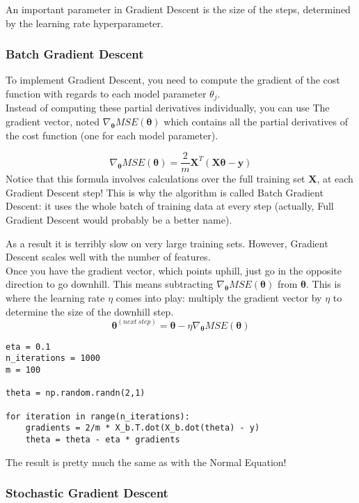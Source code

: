 \documentclass[french]{article}
\begin{document}
An important parameter in Gradient Descent is the size of the steps, determined by the learning rate hyperparameter.

\subsubsection{Batch Gradient Descent}

To implement Gradient Descent, you need to compute the gradient of the cost function with regards to each model parameter $\theta_j$.\\

Instead of computing these partial derivatives individually, you can use The gradient vector, noted $\nabla_{\bm{\theta}}MSE(\bm{\theta})$ which contains all the
partial derivatives of the cost function (one for each model parameter).

\[\nabla_{\bm{\theta}}MSE(\bm{\theta}) = \frac{2}{m} \bm{X}^T(\bm{X \theta - y}) \]
Notice that this formula involves calculations over the full training set $\bm{X}$, at each Gradient Descent step! This is why the algorithm is called Batch Gradient Descent: it uses the whole batch of training data at every step (actually, Full Gradient Descent would probably be a better name).

As a result it is terribly slow on very large training sets. However, Gradient Descent scales well with the number of features.\\

Once you have the gradient vector, which points uphill, just go in the opposite direction to go downhill. This means subtracting $\nabla_{\bm{\theta}}MSE(\bm{\theta})$ from $\bm{\theta}$. This is where the learning rate $\eta$ comes into play: multiply the gradient vector by $\eta$ to determine the size of the downhill step.
\[\bm{\theta}^{(next\ step)} = \bm{\theta} - \eta \nabla_{\bm{\theta}}MSE(\bm{\theta})\]

\begin{lstlisting}
eta = 0.1
n_iterations = 1000
m = 100

theta = np.random.randn(2,1)

for iteration in range(n_iterations):
    gradients = 2/m * X_b.T.dot(X_b.dot(theta) - y)
    theta = theta - eta * gradients
\end{lstlisting}

The result is pretty much the same as with the Normal Equation!

\subsubsection{Stochastic Gradient Descent}
\end{document}
